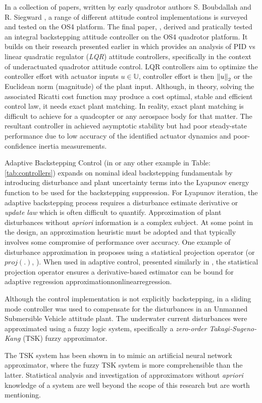 \par
\vspace{-15pt}
In a collection of papers, written by early quadrotor authors S. Boubdallah and R. Siegward \cite{pidlqr,indoorslidingmode, fullquadcoptercontrol}, a range of different attitude control implementations is surveyed and tested on the OS4 platform. The final paper, \cite{fullquadcoptercontrol}, derived and pratically tested an integral backstepping attitude controller on the OS4 quadrotor platform. It builds on their research presented earlier in \cite{pidlqr} which provides an analysis of PID vs linear quadratic regulator (\emph{LQR}) attitude controllers, specifically in the context of underactuated quadrotor attitude control. LQR controllers aim to optimize the controller effort with actuator inputs $u\in\mathbb{U}$, controller effort is then $\left\lVert u\right\rVert_2$ or the Euclidean norm (magnitude) of the plant input. Although, in theory, solving the associated Ricatti cost function may produce a cost optimal, stable and efficient control law, it needs exact plant matching. In reality, exact plant matching is difficult to achieve for a quadcopter or any aerospace body for that matter. The resultant controller in \cite{pidlqr} achieved asymptotic stability but had poor steady-state performance due to low accuracy of the identified actuator dynamics and poor-confidence inertia measurements.
\par
Adaptive Backstepping Control (in \cite{backstepping} or any other example in Table:\ref{tab:controllers}) expands on nominal ideal backstepping fundamentals by introducing disturbance and plant uncertainty terms into the Lyapunov energy function to be used for the backstepping suppression. For Lyapunov iteration, the adaptive backstepping process requires a disturbance estimate derivative or \emph{update law} which is often difficult to quantify. Approximation of plant disturbances without \emph{apriori} information is a complex subject. At some point in the design, an approximation heuristic must be adopted and that typically involves some compromise of performance over accuracy. One example of disturbance approximation in \cite{nonlinearadaptive} proposes using a statistical projection operator (or $proj(.)$, \cite{adaptiveregulation}). When used in adaptive control, presented similarly in \cite{outputfeedback}, the statistical projection operator ensures a derivative-based estimator can be bound for adaptive regression approximation{nonlinearregression}.
\par
Although the control implementation is not explicitly backstepping, in \cite{adaptiveslidingmode} a sliding mode controller was used to compensate for the disturbances in an Unmanned Submersible Vehicle attitude plant. The underwater current disturbances were approximated using a fuzzy logic system, specifically a \emph{zero-order Takagi-Sugeno-Kang} (TSK) fuzzy approximator. 
\par
The TSK system has been shown in \cite{zeroTSK} to mimic an artificial neural network approximator, where the fuzzy TSK system is more comprehensible than the latter. Statistical analysis and investigation of approximators without \emph{apriori} knowledge of a system are well beyond the scope of this research but are worth mentioning.
